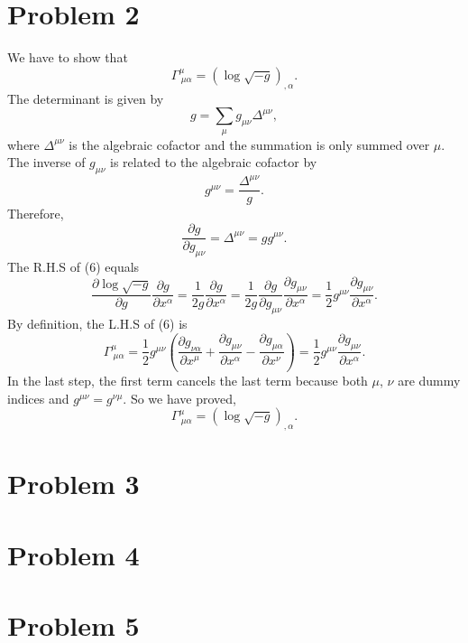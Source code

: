 \documentclass{article}
\begin{document}
\section*{Problem 2}
We have to show that 
\begin{equation} 
    \label{toprove}
    \Gamma^\mu_{~\mu \alpha} = (\log \sqrt{-g})_{,\alpha}.
\end{equation}
The determinant is given by
\begin{equation}
    g = \sum_\mu g_{\mu \nu} \Delta^{\mu \nu},
\end{equation}
where $\Delta^{\mu\nu}$ is the algebraic cofactor and the summation
is only summed over $\mu$. The inverse of $g_{\mu \nu}$ is related 
to the algebraic cofactor by
\begin{equation}
    g^{\mu \nu} = \frac{\Delta^{\mu \nu}}{g}.
\end{equation}
Therefore,
\begin{equation}
    \frac{\partial g}{\partial g_{\mu \nu}} = \Delta^{\mu \nu} = g g^{\mu \nu}.
\end{equation}
The R.H.S of (6) equals
\begin{equation}
    \frac{\partial \log \sqrt{-g}}{\partial g} \frac{\partial g}{\partial x^\alpha} 
    = \frac{1}{2g} \frac{\partial g}{\partial x^\alpha}
    = \frac{1}{2g} \frac{\partial g}{\partial g_{\mu \nu}}\frac{\partial g_{\mu \nu}}{\partial x^\alpha}
    =\frac{1}{2}g^{\mu \nu} \frac{\partial g_{\mu \nu}}{\partial x^\alpha}.
\end{equation}
By definition, the L.H.S of (6) is 
\begin{equation}
    \Gamma^\mu_{~\mu \alpha} = \frac{1}{2} g^{\mu \nu} 
    \left(
        \frac{\partial g_{\nu \alpha}}{\partial x^\mu} 
        + \frac{\partial g_{\mu \nu}}{\partial x^\alpha}
        -\frac{\partial g_{\mu \alpha}}{\partial x^\nu}
    \right)
    =\frac{1}{2}g^{\mu \nu} \frac{\partial g_{\mu \nu}}{\partial x^\alpha}.
\end{equation}
In the last step, the first term cancels the last term because both $\mu$, $\nu$ are
dummy indices and $g^{\mu \nu} = g^{\nu \mu}$. So we have proved,
\begin{equation}
    \Gamma^\mu_{~\mu \alpha} = \left(\log \sqrt{-g}\right)_{,\alpha}.
\end{equation}


\section*{Problem 3}


\section*{Problem 4}



\section*{Problem 5}
\end{document}
